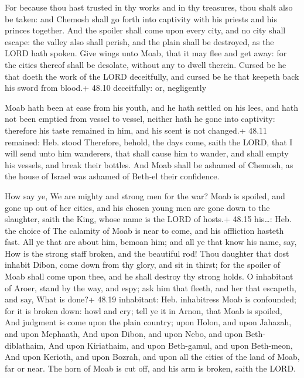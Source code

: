  For because thou hast trusted in thy works and in thy
treasures, thou shalt also be taken: and Chemosh shall go forth into
captivity with his priests and his princes together.  And
the spoiler shall come upon every city, and no city shall escape: the
valley also shall perish, and the plain shall be destroyed, as the LORD
hath spoken.  Give wings unto Moab, that it may flee and get
away: for the cities thereof shall be desolate, without any to dwell
therein.  Cursed be he that doeth the work of the LORD
deceitfully, and cursed be he that keepeth back his sword from blood.+
48.10 deceitfully: or, negligently

 Moab hath been at ease from his youth, and he hath
settled on his lees, and hath not been emptied from vessel to vessel,
neither hath he gone into captivity: therefore his taste remained in
him, and his scent is not changed.+ 48.11 remained: Heb. stood
 Therefore, behold, the days come, saith the LORD, that I
will send unto him wanderers, that shall cause him to wander, and shall
empty his vessels, and break their bottles.  And Moab shall
be ashamed of Chemosh, as the house of Israel was ashamed of Beth-el
their confidence.

 How say ye, We are mighty and strong men for the war?
 Moab is spoiled, and gone up out of her cities, and his
chosen young men are gone down to the slaughter, saith the King, whose
name is the LORD of hosts.+ 48.15 his\ldots: Heb. the choice of
 The calamity of Moab is near to come, and his affliction
hasteth fast.  All ye that are about him, bemoan him; and
all ye that know his name, say, How is the strong staff broken, and the
beautiful rod!  Thou daughter that dost inhabit Dibon, come
down from thy glory, and sit in thirst; for the spoiler of Moab shall
come upon thee, and he shall destroy thy strong holds.  O
inhabitant of Aroer, stand by the way, and espy; ask him that fleeth,
and her that escapeth, and say, What is done?+ 48.19 inhabitant: Heb.
inhabitress  Moab is confounded; for it is broken down:
howl and cry; tell ye it in Arnon, that Moab is spoiled, 
And judgment is come upon the plain country; upon Holon, and upon
Jahazah, and upon Mephaath,  And upon Dibon, and upon Nebo,
and upon Beth-diblathaim,  And upon Kiriathaim, and upon
Beth-gamul, and upon Beth-meon,  And upon Kerioth, and upon
Bozrah, and upon all the cities of the land of Moab, far or near.
 The horn of Moab is cut off, and his arm is broken, saith
the LORD.

